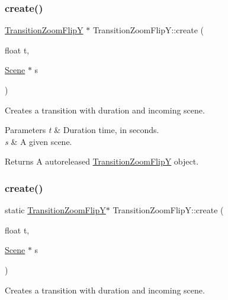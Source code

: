 \subsubsection{\texorpdfstring{create()}{create()}\hspace{0.1cm}{\footnotesize\ttfamily [3/4]}}
{\footnotesize\ttfamily \hyperlink{classTransitionZoomFlipY}{Transition\+Zoom\+FlipY} $\ast$ Transition\+Zoom\+Flip\+Y\+::create (\begin{DoxyParamCaption}\item[{float}]{t,  }\item[{\hyperlink{classScene}{Scene} $\ast$}]{s }\end{DoxyParamCaption})\hspace{0.3cm}{\ttfamily [static]}}

Creates a transition with duration and incoming scene.


\begin{DoxyParams}{Parameters}
{\em t} & Duration time, in seconds. \\
\hline
{\em s} & A given scene. \\
\hline
\end{DoxyParams}
\begin{DoxyReturn}{Returns}
A autoreleased \hyperlink{classTransitionZoomFlipY}{Transition\+Zoom\+FlipY} object. 
\end{DoxyReturn}
\mbox{\label{classTransitionZoomFlipY_aa00ace509de097af6ec08b1d471d4551}} 
\subsubsection{\texorpdfstring{create()}{create()}\hspace{0.1cm}{\footnotesize\ttfamily [4/4]}}
{\footnotesize\ttfamily static \hyperlink{classTransitionZoomFlipY}{Transition\+Zoom\+FlipY}$\ast$ Transition\+Zoom\+Flip\+Y\+::create (\begin{DoxyParamCaption}\item[{float}]{t,  }\item[{\hyperlink{classScene}{Scene} $\ast$}]{s }\end{DoxyParamCaption})\hspace{0.3cm}{\ttfamily [static]}}

Creates a transition with duration and incoming scene.


